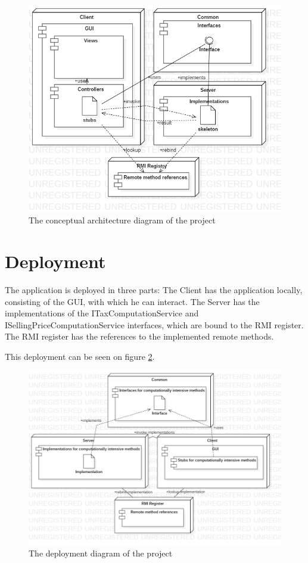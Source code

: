 \documentclass[a4paper,10pt]{report}
\begin{document}
\begin{figure}[h]
    \centering
    \includegraphics[width=1\textwidth]{architecture_diagram.png}
    \caption{The conceptual architecture diagram of the project}
    \label{fig:architecture_diagram}
\end{figure}

\section{Deployment}
The application is deployed in three parts:
The Client has the application locally, consisting of the GUI, with which he can interact.
The Server has the implementations of the ITaxComputationService and ISellingPriceComputationService interfaces, which are bound to the RMI register.
The RMI register has the references to the implemented remote methods.

This deployment can be seen on figure \ref{fig:deployment_diagram}.

\begin{figure}[h]
    \centering
    \includegraphics[width=1\textwidth]{deployment_diagram.png}
    \caption{The deployment diagram of the project}
    \label{fig:deployment_diagram}
\end{figure}
\end{document}
